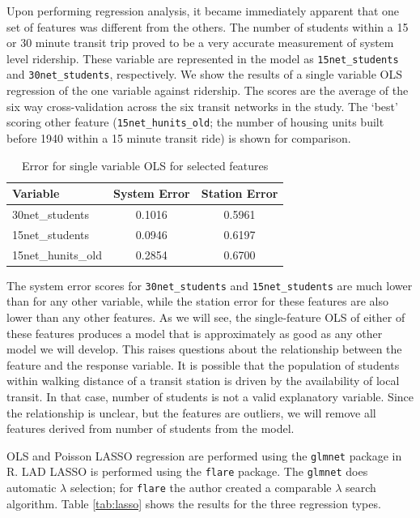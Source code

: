 \documentclass[11pt]{article}
\begin{document}
Upon performing regression analysis, it became immediately apparent that one set of features was different from the others. The number of students within a 15 or 30 minute transit trip proved to be a very accurate measurement of system level ridership. These variable are represented in the model as \texttt{15net\_students} and \texttt{30net\_students}, respectively. We show the results of a single variable OLS regression of the one variable against ridership. The scores are the average of the six way cross-validation across the six transit networks in the study. The `best' scoring other feature (\texttt{15net\_hunits\_old}; the number of housing units built before 1940 within a 15 minute transit ride) is shown for comparison.

\begin{table}
\centering
\begin{tabular}{lcc}
\toprule Variable&System Error&Station Error\\
\midrule 30net\_students&0.1016&0.5961\\
15net\_students&0.0946&0.6197\\
15net\_hunits\_old&0.2854&0.6700\\ 
\bottomrule
\end{tabular}
\caption{Error for single variable OLS for selected features}\label{tab:students}
\end{table}

The system error scores for \texttt{30net\_students} and \texttt{15net\_students} are much lower than for any other variable, while the station error for these features are also lower than any other features. As we will see, the single-feature OLS of either of these features produces a model that is approximately as good as any other model we will develop. This raises questions about the relationship between the feature and the response variable. It is possible that the population of students within walking distance of a transit station is driven by the availability of local transit. In that case, number of students is not a valid explanatory variable. Since the relationship is unclear, but the features are outliers, we will remove all features derived from number of students from the model.

OLS and Poisson LASSO regression are performed using the \texttt{glmnet} package in R. LAD LASSO is performed using the \texttt{flare} package. The \texttt{glmnet} does automatic $\lambda$ selection; for \texttt{flare} the author created a comparable $\lambda$ search algorithm. Table \ref{tab:lasso} shows the results for the three regression types. 
\end{document}
